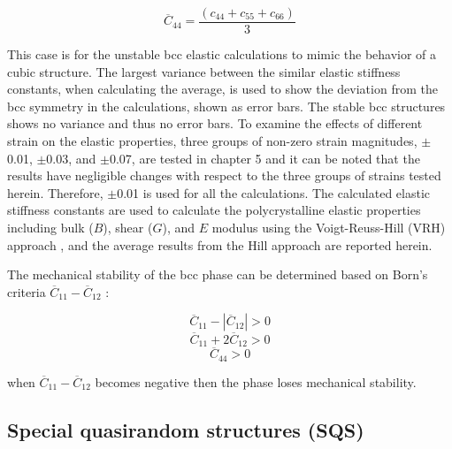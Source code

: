 \begin{equation}
\label{eq: averagec44}
\overline{C}_{44} = \frac{(c_{44} + c_{55} + c_{66})}{3}
\end{equation}

\noindent This case is for the unstable bcc elastic calculations to mimic the behavior of a cubic structure. The largest variance between the similar elastic stiffness constants, when calculating the average, is used to show the deviation from the bcc symmetry in the calculations, shown as error bars. The stable bcc structures shows no variance and thus no error bars. To examine the effects of different strain on the elastic properties, three groups of non-zero strain magnitudes, $\pm$0.01, $\pm$0.03, and $\pm$0.07, are tested in chapter 5 and it can be noted that the results have negligible changes with respect to the three groups of strains tested herein. Therefore, $\pm$0.01 is used for all the calculations. The calculated elastic stiffness constants are used to calculate the polycrystalline elastic properties including bulk ($B$), shear ($G$), and $E$ modulus using the Voigt-Reuss-Hill (VRH) approach \cite{Simmons1971b}, and the average results from the Hill approach are reported herein.

The mechanical stability of the bcc phase can be determined based on Born's criteria $\overline{C}_{11}-\overline{C}_12$ \cite{Born1998,Nye1985}:


\begin{equation}
\label{eq: born1}
\overline{C}_{11} -|\overline{C}_{12}| > 0
\end{equation}
\begin{equation}
\label{eq: born2}
\overline{C}_{11} + 2\overline{C}_{12} > 0
\end{equation}
\begin{equation}
\label{eq: born3}
\overline{C}_{44} > 0
\end{equation}

\noindent when $\overline{C}_{11} - \overline{C}_{12}$  becomes negative then the phase loses mechanical stability. 

\subsection{Special quasirandom structures (SQS)}

